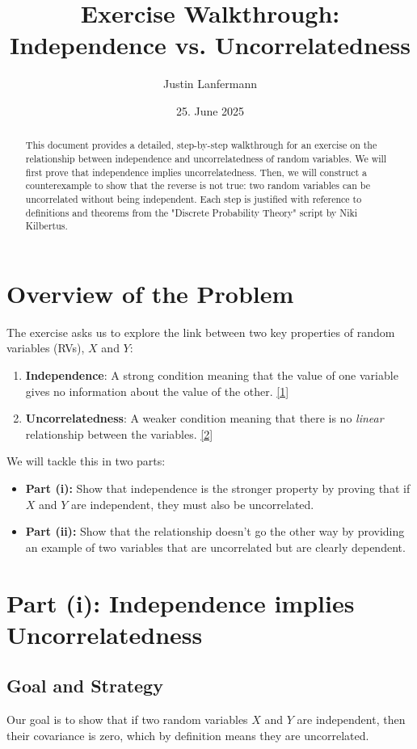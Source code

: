 \documentclass[11pt,a4paper]{article}
\title{\textbf{Exercise Walkthrough: Independence vs. Uncorrelatedness}}
\author{Justin Lanfermann}
\date{25. June 2025}
\begin{document}
\maketitle

\begin{abstract}
    This document provides a detailed, step-by-step walkthrough for an exercise on the relationship between independence and uncorrelatedness of random variables. We will first prove that independence implies uncorrelatedness. Then, we will construct a counterexample to show that the reverse is not true: two random variables can be uncorrelated without being independent. Each step is justified with reference to definitions and theorems from the "Discrete Probability Theory" script by Niki Kilbertus.
\end{abstract}

\section{Overview of the Problem}

The exercise asks us to explore the link between two key properties of random variables (RVs), $X$ and $Y$:
\begin{enumerate}
    \item \textbf{Independence}: A strong condition meaning that the value of one variable gives no information about the value of the other. \hyperlink{note1}{[1]}
    \item \textbf{Uncorrelatedness}: A weaker condition meaning that there is no \emph{linear} relationship between the variables. \hyperlink{note2}{[2]}
\end{enumerate}
We will tackle this in two parts:
\begin{itemize}
    \item \textbf{Part (i):} Show that independence is the stronger property by proving that if $X$ and $Y$ are independent, they must also be uncorrelated.
    \item \textbf{Part (ii):} Show that the relationship doesn't go the other way by providing an example of two variables that are uncorrelated but are clearly dependent.
\end{itemize}

\section{Part (i): Independence implies Uncorrelatedness}

\subsection{Goal and Strategy}
Our goal is to show that if two random variables $X$ and $Y$ are independent, then their covariance is zero, which by definition means they are uncorrelated.
\end{document}
